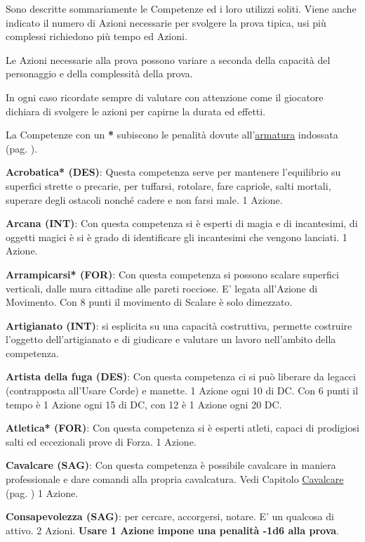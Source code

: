 \begin{multicols}{2}
Sono descritte sommariamente le Competenze ed i loro utilizzi soliti. Viene anche indicato il numero di Azioni necessarie per svolgere la prova tipica, usi più complessi richiedono più tempo ed Azioni.

Le Azioni necessarie alla prova possono variare a seconda della capacità del personaggio e della complessità della prova.

In ogni caso ricordate sempre di valutare con attenzione come il giocatore dichiara di svolgere le azioni per capirne la durata ed effetti.

La Competenze con un \textbf{*} subiscono le penalità dovute all'\hyperlink{equipaggiamento.armature.scudi}{armatura} indossata (pag. \pageref{equipaggiamentoarmature}).

\medskip

\textbf{Acrobatica* (DES)}: Questa competenza serve per mantenere l'equilibrio su superfici strette o precarie, per tuffarsi, rotolare, fare capriole, salti mortali, superare degli ostacoli nonché cadere e non farsi male. 1 Azione.

\textbf{Arcana (INT)}: Con questa competenza si è esperti di magia e di incantesimi, di oggetti magici è si è grado di identificare gli incantesimi che vengono lanciati. 1 Azione.

\textbf{Arrampicarsi* (FOR)}: Con questa competenza si possono scalare superfici verticali, dalle mura cittadine alle pareti rocciose. E' legata all'Azione di Movimento. Con 8 punti il movimento di Scalare è solo dimezzato.

\textbf{Artigianato (INT)}: si esplicita su una capacità costruttiva, permette costruire l'oggetto dell'artigianato e di giudicare e valutare un lavoro nell'ambito della competenza.

\textbf{Artista della fuga (DES)}: Con questa competenza ci si può liberare da legacci (contrapposta all'Usare Corde) e manette. 1 Azione ogni 10 di DC. Con 6 punti il tempo è 1 Azione ogni 15 di DC, con 12 è 1 Azione ogni 20 DC.\label{artistadellafuga}

\textbf{Atletica* (FOR)}: Con questa competenza si è esperti atleti, capaci di prodigiosi salti ed eccezionali prove di Forza. 1 Azione.

\textbf{Cavalcare (SAG)}: Con questa competenza è possibile cavalcare in maniera professionale e dare comandi alla propria cavalcatura. Vedi Capitolo \hyperlink{cavalcare}{Cavalcare} (pag. \pageref{cavalcare}) 1 Azione.

\textbf{Consapevolezza (SAG)}: per cercare, accorgersi, notare. E' un qualcosa di attivo. 2 Azioni. \textbf{Usare 1 Azione impone una penalità -1d6 alla prova}.


\end{multicols}

